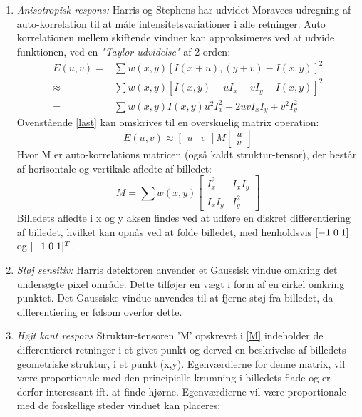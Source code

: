 \begin{enumerate}
\item{ \textit{Anisotropisk respons:} Harris og Stephens har udvidet Moravecs udregning af auto-korrelation til at måle intensitetsvariationer i alle retninger. Auto korrelationen mellem skiftende vinduer kan approksimeres ved at udvide funktionen, ved en \textit{"Taylor udvidelse"} af 2 orden:
\begin{subequations}
\begin{align}
E(u,v) = & \sum w(x,y)[I(x+u),(y+v)-I(x,y)]^2 \\
\approx & \sum w(x,y)[I(x,y)+u I_x+v I_y-I(x,y)]^2 \\
= & \sum w(x,y)I(x,y)u^2 I_x^2+2uv I_x I_y + v^2 I_y^2 \label{last}
\end{align}
\end{subequations}
Ovenstående \eqref{last} kan omskrives til en overskuelig matrix operation:
\begin{equation}
E(u,v) \approx
\begin{bmatrix}
        u & v
     \end{bmatrix}
M
\begin{bmatrix}
        u \\
        v
     \end{bmatrix}
\end{equation} 
Hvor M er auto-korrelations matricen (også kaldt struktur-tensor), der består af horisontale og vertikale afledte af billedet:
\begin{equation}
M =  \sum w(x,y)
\begin{bmatrix}
I_x^2 & I_xI_y \\
I_xI_y & I_y^2
\label{M}
\end{bmatrix}
\end{equation}
Billedets afledte i x og y aksen findes ved at udføre en diskret differentiering af billedet, hvilket kan opnås
 ved at folde billedet, med henholdsvis $[-1 \hspace{0.1cm} 0 \hspace{0.1cm} 1]$ og $[-1 \hspace{0.1cm} 0 \hspace{0.1cm} 1]^T$. }
\item{\textit{Støj sensitiv:} Harris detektoren anvender et Gaussisk vindue omkring det undersøgte pixel område. Dette tilføjer en vægt i form af en cirkel omkring punktet. Det Gaussiske vindue anvendes til at fjerne støj fra billedet, da differentiering er følsom overfor dette.}
\item{\textit{Højt kant respons} Struktur-tensoren 'M' opskrevet i \eqref{M} indeholder de differentieret retninger i et givet punkt og derved en beskrivelse af billedets geometriske struktur, i et punkt (x,y). Egenværdierne for denne matrix, vil være proportionale med den principielle krumning i billedets flade og er derfor interessant ift. at finde hjørne. Egenværdierne vil være proportionale med de forskellige steder vinduet kan placeres:
}
\end{enumerate}
